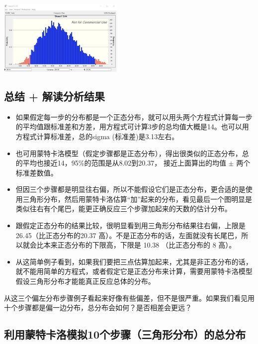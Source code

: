 \includegraphics[width=6cm]{pert32.png}

\hypertarget{ux603bux7ed3-ux89e3ux8bfbux5206ux6790ux7ed3ux679c}{%
\subsection{总结 +
解读分析结果}\label{ux603bux7ed3-ux89e3ux8bfbux5206ux6790ux7ed3ux679c}}

\begin{itemize}
\tightlist
\item
  如果假定每一步的分布都是一个正态分布，就可以用头两个方程式计算每一步的平均值跟标准差和方差，用方程式可计算3步的总均值大概是14。也可以用方程式计算标准差，总的sigma
  (标准差)是3.13左右。
\item
  也可用蒙特卡洛模型（假定步骤都是正态分布），得出很类似的正态分布，总的平均也接近14，95\%的范围是从8.02到20.37，
  接近上面算出的均值 \(\pm\) 两个标准差数值。
\item
  但因三个步骤都是明显往右偏，所以不能假设它们是正态分布，更合适的是使用三角形分布，然后用蒙特卡洛估算``加''起来的分布，看见最后一个图明显是类似往右有个尾巴，能更正确反应三个步骤加起来的天数的估计分布。
\item
  跟假定正态分布的结果比较，很明显看到用三角形分布结果往右偏，上限是
  26.45（比正态分布的20.37
  高）。不是正态分布的话，左面就没有长尾巴，所以就会比本来正态分布的下限高，下限是
  10.38 （比正态分布的 8 高）。
\item
  从这简单例子看到，如果我们要把三点估算加起来，尤其是非正态分布的话，就不能用简单的方程式，或者假定它是正态分布来计算，需要用蒙特卡洛模型假设三角形分布才能能真正反应总体的分布。\\
\end{itemize}

从这三个偏左分布步骤例子看起来好像有些偏差，但不是很严重。如果我们看见用十个步骤都是偏一边分布，总分布会如何？是否相差会更远？

\hypertarget{ux5229ux7528ux8499ux5730ux5361ux7f57ux6a21ux62df10ux4e2aux6b65ux9aa4ux4e09ux89d2ux5f62ux5206ux5e03ux7684ux603bux5206ux5e03}{%
\subsection{利用蒙特卡洛模拟10个步骤（三角形分布）的总分布}\label{ux5229ux7528ux8499ux5730ux5361ux7f57ux6a21ux62df10ux4e2aux6b65ux9aa4ux4e09ux89d2ux5f62ux5206ux5e03ux7684ux603bux5206ux5e03}}

